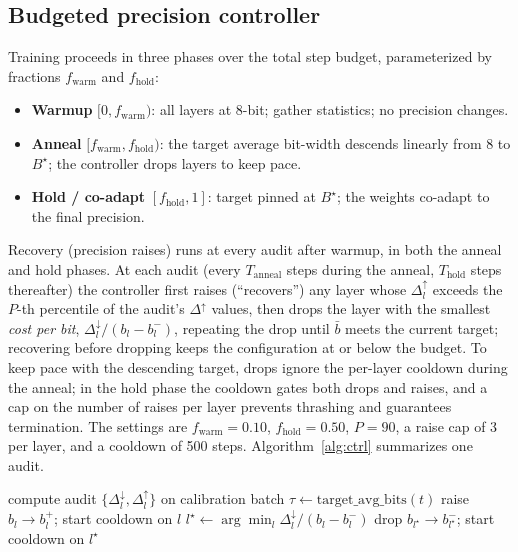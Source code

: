 \documentclass[conference]{IEEEtran}
\begin{document}
\subsection{Budgeted precision controller}
Training proceeds in three phases over the total step budget, parameterized by
fractions \(f_{\text{warm}}\) and \(f_{\text{hold}}\):
\begin{itemize}
\item \textbf{Warmup} \([0, f_{\text{warm}})\): all layers at 8-bit; gather
statistics; no precision changes.
\item \textbf{Anneal} \([f_{\text{warm}}, f_{\text{hold}})\): the target average
bit-width descends linearly from 8 to \(B^\star\); the controller drops layers to
keep pace.
\item \textbf{Hold / co-adapt} \([f_{\text{hold}}, 1]\): target pinned at
\(B^\star\); the weights co-adapt to the final precision.
\end{itemize}
Recovery (precision raises) runs at every audit after warmup, in both the anneal
and hold phases.
At each audit (every \(T_{\text{anneal}}\) steps during the anneal,
\(T_{\text{hold}}\) steps thereafter) the controller first raises (``recovers'')
any layer whose \(\Delta^{\uparrow}_l\) exceeds the \(P\)-th percentile of the
audit's \(\Delta^{\uparrow}\) values, then drops the layer with the smallest
\emph{cost per bit}, \(\Delta^{\downarrow}_l / (b_l - b_l^-)\), repeating the drop
until \(\bar{b}\) meets the current target; recovering before dropping keeps the
configuration at or below the budget. To keep pace with the descending target,
drops ignore the per-layer cooldown during the anneal; in the hold phase the
cooldown gates both drops and raises, and a cap on the number of raises per layer
prevents thrashing and guarantees termination. The settings are \(f_{\text{warm}}
=0.10\), \(f_{\text{hold}}=0.50\), \(P=90\), a raise cap of 3 per layer, and a
cooldown of 500 steps. Algorithm~\ref{alg:ctrl} summarizes one audit.

\begin{algorithm}[t]
\caption{Controller update at audit step \(t\)}
\label{alg:ctrl}
\begin{algorithmic}[1]
\State compute audit \(\{\Delta^{\downarrow}_l, \Delta^{\uparrow}_l\}\) on calibration batch
\State \(\tau \gets \text{target\_avg\_bits}(t)\) 
 
     \State raise \(b_l \to b_l^+\); start cooldown on \(l\)
  \EndIf
\EndFor
{} 
  \State \(l^\star \gets \arg\min_l \Delta^{\downarrow}_l / (b_l - b_l^-)\)
  \State drop \(b_{l^\star} \to b_{l^\star}^-\); start cooldown on \(l^\star\)
\EndWhile
\end{algorithmic}
\end{algorithm}
\end{document}
